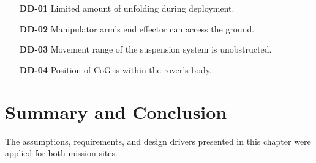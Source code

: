 \begin{itemize}
    \item[\textbf{DD-01}] Limited amount of unfolding during deployment.
    \item[\textbf{DD-02}] Manipulator arm's end effector can access the ground.
    \item[\textbf{DD-03}] Movement range of the suspension system is unobstructed.
    \item[\textbf{DD-04}] Position of \ac{CoG} is within the rover's body.
\end{itemize}

\section{Summary and Conclusion}
\label{sec:RequirementsAndDesignDrivers:SummaryAndConclusion}
The assumptions, requirements, and design drivers presented in this chapter were applied for both mission sites.

